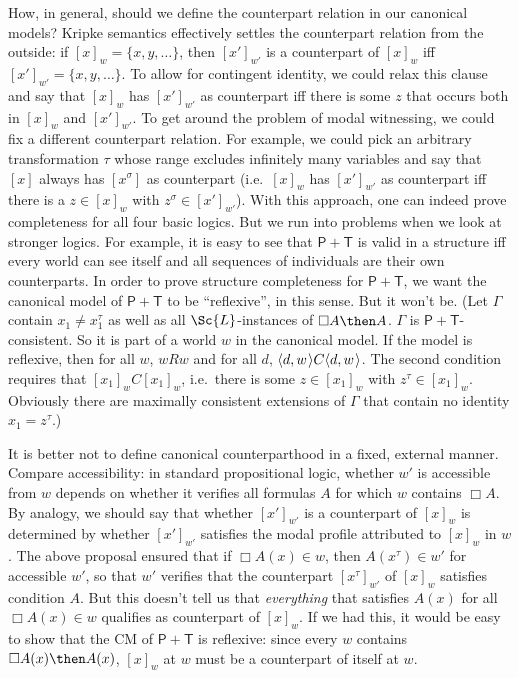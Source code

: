 \documentclass[11pt]{woarticle}
\theoremstyle{break}
\theoremstyle{nonumberplain}
\newcommand{\s}[1]{\ensuremath{\mathsf{#1}}}
\newcommand{\1}{\;\,|\;\,}
\renewcommand{\t}[1]{\ensuremath{\langle #1  \makebox[.2ex]{}\rangle}}
\begin{document}
How, in general, should we define the counterpart relation in our canonical
models? Kripke semantics effectively settles the counterpart relation from the
outside: if $[x]_w = \{ x, y, \ldots\}$, then $[x']_{w'}$ is a counterpart of
$[x]_w$ iff $[x']_{w'} = \{ x,y,\ldots\}$. To allow for contingent identity, we
could relax this clause and say that $[x]_w$ has $[x']_{w'}$ as counterpart iff
there is some $z$ that occurs both in $[x]_w$ and $[x']_{w'}$. To get around the
problem of modal witnessing, we could fix a different counterpart relation. For
example, we could pick an arbitrary transformation $\tau$ whose range excludes
infinitely many variables and say that $[x]$ always has $[x^\sigma]$ as
counterpart (i.e.\ $[x]_w$ has $[x']_{w'}$ as counterpart iff there is a
$z\in [x]_w$ with $z^\sigma \in [x']_{w'}$). With this approach, one can indeed
prove completeness for all four basic logics. But we run into problems when we
look at stronger logics. For example, it is easy to see that $\s{P+T}$ is valid
in a structure iff every world can see itself and all sequences of individuals
are their own counterparts. In order to prove structure completeness for
$\s{P+T}$, we want the canonical model of $\s{P+T}$ to be ``reflexive'', in this
sense. But it won't be. (Let $\Gamma$ contain $x_1 \not= x_1^\tau$ as well as
all $\Sc{L}$-instances of $\Box A \then A$. $\Gamma$ is $\s{P+T}$-consistent. So
it is part of a world $w$ in the canonical model. If the model is reflexive,
then for all $w$, $wRw$ and for all $d$, $\t{d,w}C\t{d,w}$. The second condition
requires that $[x_1]_wC[x_1]_w$, i.e.\ there is some $z\in [x_1]_w$ with
$z^\tau \in [x_1]_w$. Obviously there are maximally consistent extensions of
$\Gamma$ that contain no identity $x_1\!=\!z^\tau$.)

It is better not to define canonical counterparthood in a fixed, external
manner. Compare accessibility: in standard propositional logic, whether $w'$ is
accessible from $w$ depends on whether it verifies all formulas $A$ for which
$w$ contains $\Box A$. By analogy, we should say that whether $[x']_{w'}$ is a
counterpart of $[x]_{w}$ is determined by whether $[x']_{w'}$ satisfies the
modal profile attributed to $[x]_w$ in $w$. The above proposal ensured that if
$\Box A(x) \in w$, then $A(x^\tau) \in w'$ for accessible $w'$, so that $w'$
verifies that the counterpart $[x^\tau]_{w'}$ of $[x]_w$ satisfies condition
$A$. But this doesn't tell us that \emph{everything} that satisfies $A(x)$ for
all $\Box A(x) \in w$ qualifies as counterpart of $[x]_w$. If we had this, it
would be easy to show that the CM of \s{P+T} is reflexive: since every $w$
contains $\Box A(x) \then A(x)$, $[x]_w$ at $w$ must be a counterpart of itself
at $w$.
\end{document}
